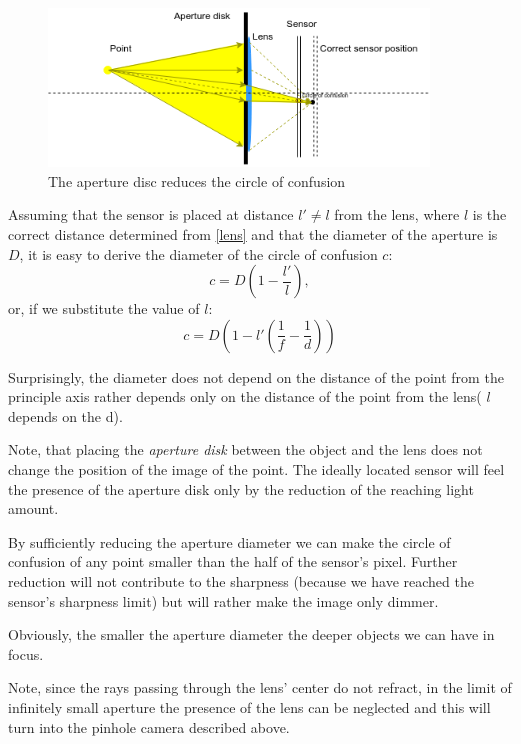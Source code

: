\documentclass[a4paper,10pt]{article}
\begin{document}
\begin{figure}[h]
\centering
 \includegraphics[width=0.9\textwidth]{../../images/lens_confusion_circle_aperture.png}
 \caption{The aperture disc reduces the circle of confusion }
 \label{fig:lens_aperture}
\end{figure}

Assuming that the sensor is placed at distance $l'\neq l$ from the lens, where $l$ is the correct distance determined from \eqref{lens} and that the diameter of the aperture is $D$, it is easy to derive the diameter of the circle of confusion $c$:
\begin{equation}
c = D\left(1-\frac{l'}{l}\right),
\end{equation} 
or, if we substitute the value of $l$:
\begin{equation}
c=D\left(1 -l' \left(\frac{1}{f} - \frac{1}{d}\right )\right )
\label{conf_circ_expanded}
\end{equation} 

Surprisingly,  the diameter does not depend on the distance of the point from the principle axis rather depends only on the distance of the point from the lens( $l$ depends on the d).  

Note, that placing the {\it aperture disk} between the object and the lens does not change the position of the image of the point. The ideally located sensor will feel the presence of the aperture disk only by the reduction of the reaching light amount. 

By sufficiently reducing the aperture diameter we can make the circle of confusion of any point smaller than the half of the sensor's pixel. Further reduction will not contribute to the sharpness (because we have reached the sensor's sharpness limit) but will rather  make the image only dimmer.

Obviously, the smaller the aperture diameter the deeper objects we can have in focus. 

Note, since the rays passing through the lens' center do not refract, in the limit of infinitely small aperture the presence of the lens can be neglected and this will turn into the pinhole camera described above. 
\end{document}
